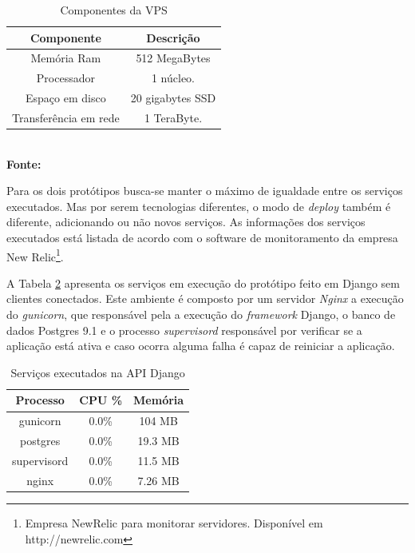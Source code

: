   \begin{table}[h]
    \centering
    \caption{\hspace{0.1cm} Componentes da VPS}
    \vspace{-0.3cm} %
    \label{tab:components-digital-ocean-vps}
    \begin{tabular}{c|c}
      \hline
      \textbf{Componente} & \textbf{Descrição} \\
      \hline
      Memória Ram & 512 MegaBytes \\
      Processador & 1 núcleo. \\
      Espaço em disco & 20 gigabytes SSD \\
      Transferência em rede & 1 TeraByte. \\
      \hline
    \end{tabular}
    \vspace{.1cm}  %
    \small
    {\footnotesize\\ \textbf{Fonte: }}
  \end{table}

  Para os dois protótipos busca-se manter o máximo de igualdade entre os serviços executados. Mas por serem
  tecnologias diferentes, o modo de \textit{deploy} também é diferente, adicionando ou não novos serviços.
  As informações dos serviços executados está listada de acordo com o software de monitoramento
  da empresa New Relic\footnote[18]{ Empresa NewRelic para monitorar servidores. Disponível em http://newrelic.com}.

  A Tabela \ref{tab:services-in-api-django} apresenta os serviços em execução do protótipo feito em Django sem clientes conectados.
  Este ambiente é composto por um servidor \textit{Nginx} a execução do \textit{gunicorn},
  que responsável pela a execução do \textit{framework} Django, o banco de dados Postgres 9.1 e o processo \textit{supervisord} responsável por
  verificar se a aplicação está ativa e caso ocorra alguma falha é capaz de reiniciar a aplicação.

  \begin{table}[h]
    \centering
    \footnotesize
    \setlength{\abovecaptionskip}{0pt}
    \setlength{\belowcaptionskip}{0pt}
    \caption[Serviços executados na API Django]{Serviços executados na API Django}
    \label{tab:services-in-api-django}
    \begin{tabular}{c|c|c}
      \hline \hline
      Processo  & 	CPU \% &	Memória \\
      \hline \hline
      gunicorn &	0.0\% &		104 MB \\
      postgres &	0.0\% &		19.3 MB \\
      supervisord &	0.0\% &		11.5 MB \\
      nginx &		0.0\% &		7.26 MB \\
      \hline \hline
    \end{tabular}
  \end{table}

